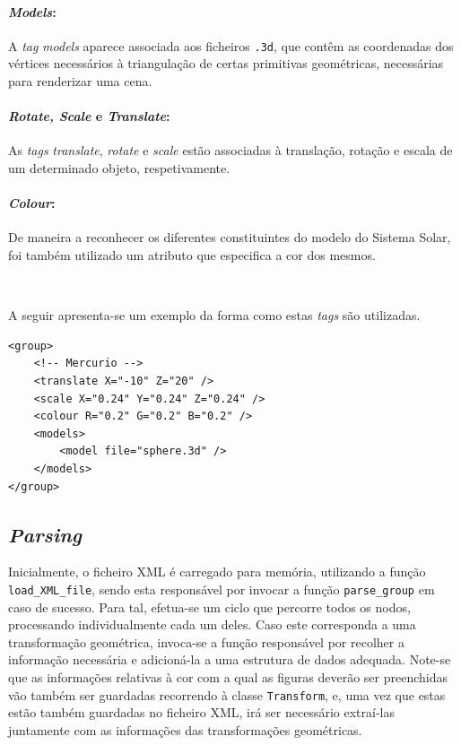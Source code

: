 \documentclass[a4paper, 11pt]{article}
\begin{document}
\paragraph{\textit{Models}:} A \textit{tag} \textit{models} aparece associada aos
ficheiros \texttt{.3d}, que contêm as coordenadas dos vértices necessários à triangulação
de certas primitivas geométricas, necessárias para renderizar uma cena.

\paragraph{\textit{Rotate, Scale} e \textit{Translate}:} As \textit{tags} \textit{translate},
\textit{rotate} e \textit{scale} estão  associadas à translação, rotação e escala
de um determinado objeto, respetivamente.
 
\paragraph{\textit{Colour}:} De maneira a reconhecer os diferentes constituintes
do modelo do Sistema Solar, foi também utilizado um atributo que especifica a cor
dos mesmos. 

\

A seguir apresenta-se um exemplo da forma como estas \textit{tags} são utilizadas.

\begin{verbatim}
<group>
    <!-- Mercurio -->
    <translate X="-10" Z="20" />
    <scale X="0.24" Y="0.24" Z="0.24" />
    <colour R="0.2" G="0.2" B="0.2" />
    <models>
        <model file="sphere.3d" />
    </models>
</group>
\end{verbatim}

\hfill

\subsection*{\textit{Parsing}}

Inicialmente, o ficheiro XML é carregado para memória, utilizando a função 
\texttt{load\_XML\_file}, sendo esta responsável por invocar a função \texttt{parse\_group}
em caso de sucesso. Para tal, efetua-se um ciclo que percorre todos os nodos, processando
individualmente cada um deles. Caso este corresponda a uma transformação geométrica,
invoca-se a função responsável por recolher a informação necessária e adicioná-la
a uma estrutura de dados adequada. Note-se que as informações relativas à cor com a
qual as figuras deverão ser preenchidas vão também ser guardadas recorrendo à classe 
\texttt{Transform}, e, uma vez que estas estão também guardadas no ficheiro XML, irá ser 
necessário extraí-las juntamente com as informações das transformações geométricas. 
\end{document}
